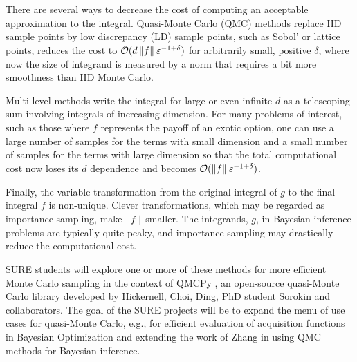 There are several ways to decrease the cost of computing an acceptable approximation to the integral.  Quasi-Monte Carlo (QMC) methods \cite{DicEtal14a} replace IID sample points by low discrepancy (LD) sample points, such as Sobol' or lattice points, reduces the cost to $\mathcal{O}(d\left \lVert f \right \rVert_{{}}\varepsilon^{-1+\delta})$ for arbitrarily small, positive $\delta$, where now the size of integrand is measured by a norm that requires a bit more smoothness than IID Monte Carlo. 

Multi-level methods write the integral for large or even infinite $d$ as a telescoping sum involving integrals of increasing dimension. 
For many problems of interest, such as those where $f$ represents the payoff of an exotic option, one can use a large number of samples for the terms with small dimension and a small number of samples for the terms with large dimension so that the total computational cost now loses its $d$ dependence and becomes $\mathcal{O}(\left \lVert f \right \rVert_{{}}\varepsilon^{-1+\delta})$.
 

Finally, the variable transformation from the original integral of $g$ to the final integral $f$ is non-unique.  Clever transformations, which may be regarded as importance sampling, make $\left \lVert f \right \rVert_{{}}$ smaller.  The integrands, $g$, in Bayesian inference problems are typically quite peaky, and importance sampling may drastically reduce the computational cost.

SURE students will explore one or more of these methods for more efficient Monte Carlo sampling in the context of QMCPy \cite{QMCPy2020a,QMCBlog}, an open-source quasi-Monte Carlo library developed by Hickernell, Choi, Ding, PhD student Sorokin and collaborators. The goal of the SURE projects will be to expand the menu of use cases for quasi-Monte Carlo, e.g., for efficient evaluation of acquisition functions in Bayesian Optimization and extending the work of Zhang \cite{Zha21a} in using QMC methods for Bayesian inference. 